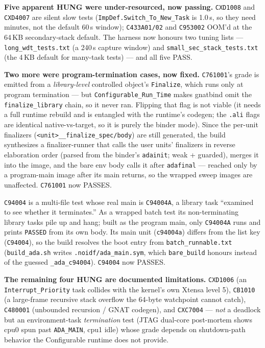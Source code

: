 \textbf{Five apparent HUNG were under-resourced, now passing.} \texttt{CXD1008} and
\texttt{CXD4007} are silent slow tests (\texttt{ImpDef.Switch\_To\_New\_Task} is 1.0\,s, so
they need minutes, not the default 60\,s window); \texttt{C433A01/02} and \texttt{C953002}
OOM'd at the 64\,KB secondary-stack default. The harness now honours two tuning lists ---
\texttt{long\_wdt\_tests.txt} (a 240\,s capture window) and \texttt{small\_sec\_stack\_tests.txt}
(the 4\,KB default for many-task tests) --- and all five PASS.

\textbf{Two more were program-termination cases, now fixed.}
\texttt{C761001}'s grade is emitted from a \emph{library-level} controlled object's
\texttt{Finalize}, which runs only at program termination --- but
\texttt{Configurable\_Run\_Time} makes gnatbind omit the \texttt{finalize\_library} chain,
so it never ran. Flipping that flag is not viable (it needs a full runtime rebuild and is
entangled with the runtime's codegen; the \texttt{.ali} flags are identical native-vs-target,
so it is purely the binder mode). Since the per-unit finalizers
(\texttt{<unit>\_\_finalize\_spec/body}) are still generated, the build synthesizes a
finalizer-runner that calls the user units' finalizers in reverse elaboration order (parsed
from the binder's \texttt{adainit}; weak + guarded), merges it into the image, and the bare
env body calls it after \texttt{adafinal} --- reached only by a program-main image after its
main returns, so the wrapped sweep images are unaffected. \texttt{C761001} now PASSES.

\texttt{C94004} is a multi-file test whose real main is \texttt{C94004A}, a library task
``examined to see whether it terminates.'' As a wrapped batch test its non-terminating
library tasks pile up and hang; built as the program main, only \texttt{C94004A} runs and
prints \texttt{PASSED} from its own body. Its main unit (\texttt{c94004a}) differs from the
list key (\texttt{C94004}), so the build resolves the boot entry from
\texttt{batch\_runnable.txt} (\texttt{build\_ada.sh} writes \texttt{.noidf/ada\_main.sym},
which \texttt{bare\_build} honours instead of the guessed \texttt{\_ada\_c94004}).
\texttt{C94004} now PASSES.

\textbf{The remaining four HUNG are documented limitations.} \texttt{CXD1006} (an
\texttt{Interrupt\_Priority} task collides with the kernel's own Xtensa level 5),
\texttt{CB1010} (a large-frame recursive stack overflow the 64-byte watchpoint cannot
catch), \texttt{C480001} (unbounded recursion / GNAT codegen), and \texttt{CXC7004}
--- \emph{not} a deadlock but an environment-task \emph{termination} test (JTAG dual-core
post-mortem shows cpu0 spun past \texttt{ADA\_MAIN}, cpu1 idle) whose grade depends on
shutdown-path behavior the Configurable runtime does not provide.


